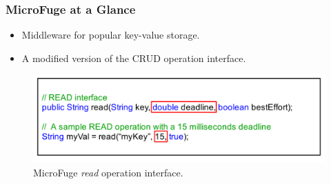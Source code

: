 \documentclass{beamer}
\newcommand{\myv}{\vspace{3 mm}}
\begin{document}
\begin{frame}
  \frametitle{MicroFuge at a Glance}
  \begin{itemize}
  \item Middleware for popular key-value storage.
    \myv
  \item A modified version of the CRUD operation interface.
  \end{itemize}
  \begin{figure}
    \vspace{-5 mm}
    \includegraphics[scale=0.15]{img/MicroFuge_protocol.png}
    \caption{MicroFuge \textit{read} operation interface.}
  \end{figure}
\end{frame}
\end{document}
